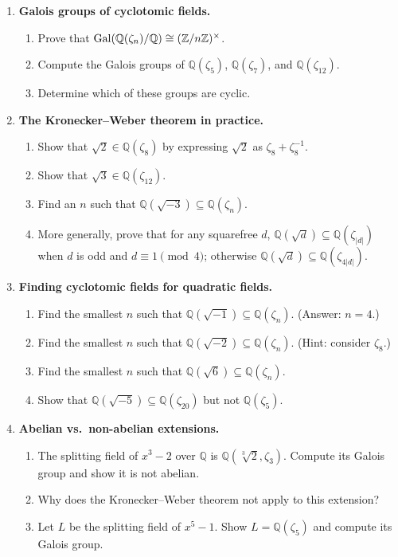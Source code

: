 \begin{enumerate}

    \item \textbf{Galois groups of cyclotomic fields.}
    \begin{enumerate}
        \item Prove that $\operatorname{Gal}(\mathbb{Q}(\zeta_n)/\mathbb{Q}) \cong (\mathbb{Z}/n\mathbb{Z})^\times$.
        \item Compute the Galois groups of $\mathbb{Q}(\zeta_5)$, $\mathbb{Q}(\zeta_7)$, and $\mathbb{Q}(\zeta_{12})$.
        \item Determine which of these groups are cyclic.
    \end{enumerate}

    \item \textbf{The Kronecker--Weber theorem in practice.}
    \begin{enumerate}
        \item Show that $\sqrt{2} \in \mathbb{Q}(\zeta_8)$ by expressing $\sqrt{2}$ as $\zeta_8 + \zeta_8^{-1}$.
        \item Show that $\sqrt{3} \in \mathbb{Q}(\zeta_{12})$.
        \item Find an $n$ such that $\mathbb{Q}(\sqrt{-3}) \subseteq \mathbb{Q}(\zeta_n)$.
        \item More generally, prove that for any squarefree $d$, $\mathbb{Q}(\sqrt{d}) \subseteq \mathbb{Q}(\zeta_{|d|})$ when $d$ is odd and $d \equiv 1 \pmod{4}$; otherwise $\mathbb{Q}(\sqrt{d}) \subseteq \mathbb{Q}(\zeta_{4|d|})$.
    \end{enumerate}

    \item \textbf{Finding cyclotomic fields for quadratic fields.}
    \begin{enumerate}
        \item Find the smallest $n$ such that $\mathbb{Q}(\sqrt{-1}) \subseteq \mathbb{Q}(\zeta_n)$. (Answer: $n=4$.)
        \item Find the smallest $n$ such that $\mathbb{Q}(\sqrt{-2}) \subseteq \mathbb{Q}(\zeta_n)$. (Hint: consider $\zeta_8$.)
        \item Find the smallest $n$ such that $\mathbb{Q}(\sqrt{6}) \subseteq \mathbb{Q}(\zeta_n)$.
        \item Show that $\mathbb{Q}(\sqrt{-5}) \subseteq \mathbb{Q}(\zeta_{20})$ but not $\mathbb{Q}(\zeta_5)$.
    \end{enumerate}

    \item \textbf{Abelian vs.\ non-abelian extensions.}
    \begin{enumerate}
        \item The splitting field of $x^3 - 2$ over $\mathbb{Q}$ is $\mathbb{Q}(\sqrt[3]{2}, \zeta_3)$. Compute its Galois group and show it is not abelian.
        \item Why does the Kronecker--Weber theorem not apply to this extension?
        \item Let $L$ be the splitting field of $x^5 - 1$. Show $L = \mathbb{Q}(\zeta_5)$ and compute its Galois group.
    \end{enumerate}


\end{enumerate}

